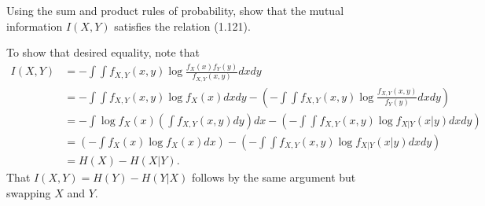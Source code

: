 \begin{cBoxA}{}
 Using the sum and product rules of probability, show that the mutual
information $I(X,Y)$ satisfies the relation (1.121).
\end{cBoxA}

To show that desired equality, note that 
\begin{align*}
I(X,Y) & =-\int\int f_{X,Y}(x,y)\log\frac{f_{X}(x)f_{Y}(y)}{f_{X,Y}(x,y)}dxdy\\
 & =-\int\int f_{X,Y}(x,y)\log f_{X}(x)dxdy-\left(-\int\int f_{X,Y}(x,y)\log\frac{f_{X,Y}(x,y)}{f_{Y}(y)}dxdy\right)\\
 & =-\int\log f_{X}(x)\left(\int f_{X,Y}(x,y)dy\right)dx-\left(-\int\int f_{X,Y}(x,y)\log f_{X\vert Y}(x\vert y)dxdy\right)\\
 & =\left(-\int f_{X}(x)\log f_{X}(x)dx\right)-\left(-\int\int f_{X,Y}(x,y)\log f_{X\vert Y}(x\vert y)dxdy\right)\\
 & =H(X)-H(X\vert Y).
\end{align*}
That $I(X,Y)=H(Y)-H(Y\vert X)$ follows by the same argument but swapping
$X$ and $Y$. 


